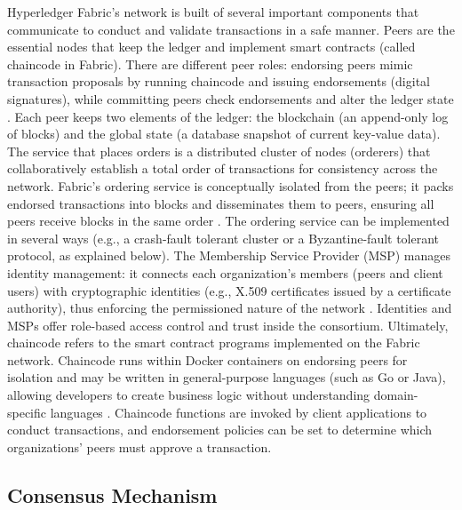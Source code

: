 \documentclass[a4paper,10pt]{report}
\begin{document}
Hyperledger Fabric’s network is built of several important components that communicate to conduct and validate transactions in a safe manner.  Peers are the essential nodes that keep the ledger and implement smart contracts (called chaincode in Fabric).  There are different peer roles: endorsing peers mimic transaction proposals by running chaincode and issuing endorsements (digital signatures), while committing peers check endorsements and alter the ledger state \cite{androulaki2018fabric}.  Each peer keeps two elements of the ledger: the blockchain (an append-only log of blocks) and the global state (a database snapshot of current key-value data).  The service that places orders is a distributed cluster of nodes (orderers) that collaboratively establish a total order of transactions for consistency across the network.  Fabric’s ordering service is conceptually isolated from the peers; it packs endorsed transactions into blocks and disseminates them to peers, ensuring all peers receive blocks in the same order \cite{androulaki2018fabric}.  The ordering service can be implemented in several ways (e.g., a crash-fault tolerant cluster or a Byzantine-fault tolerant protocol, as explained below).  The Membership Service Provider (MSP) manages identity management: it connects each organization’s members (peers and client users) with cryptographic identities (e.g., X.509 certificates issued by a certificate authority), thus enforcing the permissioned nature of the network \cite{androulaki2018fabric}.  Identities and MSPs offer role-based access control and trust inside the consortium.  Ultimately, chaincode refers to the smart contract programs implemented on the Fabric network.  Chaincode runs within Docker containers on endorsing peers for isolation and may be written in general-purpose languages (such as Go or Java), allowing developers to create business logic without understanding domain-specific languages \cite{androulaki2018fabric}.  Chaincode functions are invoked by client applications to conduct transactions, and endorsement policies can be set to determine which organizations’ peers must approve a transaction.

\subsection{Consensus Mechanism}
\end{document}
